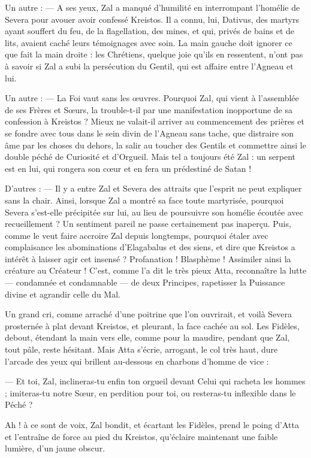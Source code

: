 \documentclass[a4paper, 11pt, oneside, polutonikogreek, french]{article}
\begin{document}
Un autre : --- A ses yeux, Zal a manqué d'humilité en interrompant l'homélie de Severa pour avouer avoir confessé Kreistos. Il a connu, lui, Dativus, des martyrs ayant souffert du feu, de la flagellation, des mines, et qui, privés de bains et de lits, avaient caché leurs témoignages avec soin. La main gauche doit ignorer ce que fait la main droite : les Chrétiens, quelque joie qu'ils en ressentent, n'ont pas à savoir si Zal a subi la persécution du Gentil, qui est affaire entre l'Agneau et lui.

Un autre : --- La Foi vaut sans les œuvres. Pourquoi Zal, qui vient à l'assemblée de ses Frères et Sœurs, la trouble-t-il par une manifestation inopportune de sa confession à Kreistos ? Mieux ne valait-il arriver au commencement des prières et se fondre avec tous dans le sein divin de l'Agneau sans tache, que distraire son âme par les choses du dehors, la salir au toucher des Gentils et commettre ainsi le double péché de Curiosité et d'Orgueil. Mais tel a toujours été Zal : un serpent est en lui, qui rongera son cœur et en fera un prédestiné de Satan !

D'autres : --- Il y a entre Zal et Severa des attraits que l'esprit ne peut expliquer sans la chair. Ainsi, lorsque Zal a montré sa face toute martyrisée, pourquoi Severa s'est-elle précipitée sur lui, au lieu de poursuivre son homélie écoutée avec recueillement ? Un sentiment pareil ne passe certainement pas inaperçu. Puis, comme le veut faire accroire Zal depuis longtemps, pourquoi étaler avec complaisance les abominations d'Elagabalus et des siens, et dire que Kreistos a intérêt à laisser agir cet insensé ? Profanation ! Blasphème ! Assimiler ainsi la créature au Créateur ! C'est, comme l'a dit le très pieux Atta, reconnaître la lutte --- condamnée et condamnable --- de deux Principes, rapetisser la Puissance divine et agrandir celle du Mal.

Un grand cri, comme arraché d’une poitrine que l'on ouvrirait, et voilà Severa prosternée à plat devant Kreistos, et pleurant, la face cachée au sol. Les Fidèles, debout, étendant la main vers elle, comme pour la maudire, pendant que Zal, tout pâle, reste hésitant. Mais Atta s'écrie, arrogant, le col très haut, dure l'arcade des yeux qui brillent au-dessous en charbons d'homme de vice :

--- Et toi, Zal, inclineras-tu enfin ton orgueil devant Celui qui racheta les hommes ; imiteras-tu notre Sœur, en perdition pour toi, ou resteras-tu inflexible dans le Péché ?

Ah ! à ce sont de voix, Zal bondit, et écartant les Fidèles, prend le poing d'Atta et l'entraîne de force au pied du Kreistos, qu'éclaire maintenant une faible lumière, d'un jaune obscur.
\end{document}
